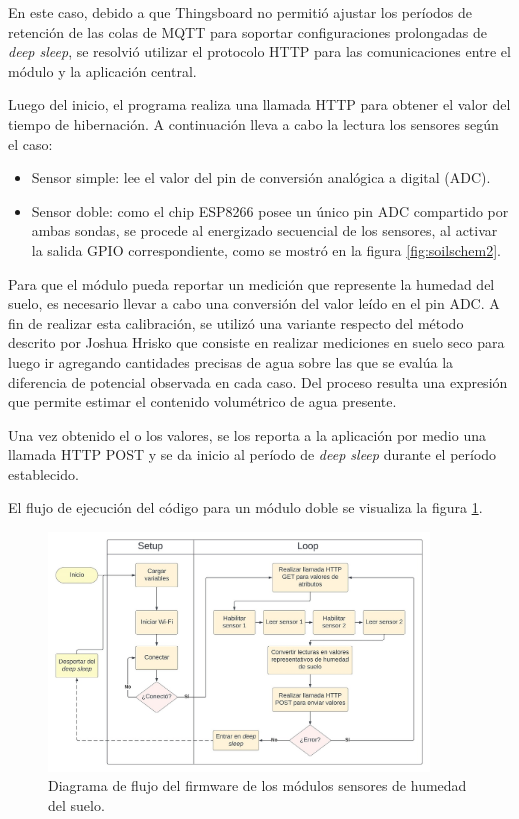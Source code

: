 En este caso, debido a que Thingsboard no permitió ajustar los períodos de retención de las colas de MQTT para soportar configuraciones prolongadas de \textit{deep sleep}, se resolvió utilizar el protocolo HTTP para las comunicaciones entre el módulo y la aplicación central. 

Luego del inicio, el programa realiza una llamada HTTP para obtener el valor del tiempo de hibernación. A continuación lleva a cabo la lectura los sensores según el caso:
\begin{itemize}
\item Sensor simple: lee el valor del pin de conversión analógica a digital (ADC).
\item Sensor doble: como el chip ESP8266 posee un único pin ADC compartido por ambas sondas, se procede al energizado secuencial de los sensores, al activar la salida GPIO correspondiente, como se mostró en la figura \ref{fig:soilschem2}. 

\end{itemize}


Para que el módulo pueda reportar un medición que represente la humedad del suelo, es necesario llevar a cabo una conversión del valor leído en el pin ADC. A fin de realizar esta calibración, se utilizó una variante respecto del método descrito por Joshua Hrisko \citep{soilcalibration} que consiste en realizar mediciones en suelo seco para luego ir agregando cantidades precisas de agua sobre las que se evalúa la diferencia de potencial observada en cada caso. Del proceso resulta una expresión que permite estimar el contenido volumétrico de agua presente.

Una vez obtenido el o los valores, se los reporta a la aplicación por medio una llamada HTTP POST y se da inicio al período de \textit{deep sleep} durante el período establecido.

El flujo de ejecución del código para un módulo doble se visualiza la figura \ref{fig:flow_soilsensor}.


\begin{figure}[!h]
	\centering
	\includegraphics[width=0.9\textwidth]{./Figures/chapter3/FirmwareSoilSensor.jpg}
	\caption[Diagrama de flujo del firmware de los módulos sensores de humedad del suelo]{Diagrama de flujo del firmware de los módulos sensores de humedad del suelo.}
	\label{fig:flow_soilsensor}
\end{figure}


